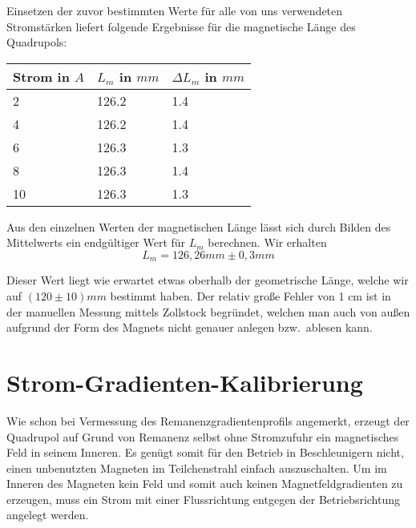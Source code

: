\documentclass[bigchapter,colorback,accentcolor=tud4b,linedtoc,11pt]{tudreport}
\begin{document}
Einsetzen der zuvor bestimmten Werte für alle von uns verwendeten Stromstärken liefert folgende Ergebnisse für die magnetische Länge des Quadrupols:
\begin{center}
  \begin{tabular}{|p{2.6cm}|p{2.6cm}|p{2.6cm}|}
    \hline
    Strom in $A$ & $L_m$ in $mm$ & $\Delta L_m$ in $mm$ \\ \hline
    2            & 126.2         & 1.4                  \\ \hline
    4            & 126.2         & 1.4                  \\ \hline
    6            & 126.3         & 1.3                  \\ \hline
    8            & 126.3         & 1.4                  \\ \hline
    10           & 126.3         & 1.3                  \\ \hline
	\end{tabular}
\end{center}

Aus den einzelnen Werten der magnetischen Länge lässt sich durch Bilden des Mittelwerts ein endgültiger Wert für $L_m$ berechnen. Wir erhalten $$L_m=126,26mm\pm0,3mm$$

Dieser Wert liegt wie erwartet etwas oberhalb der geometrische Länge, welche wir auf $(120 \pm 10)mm$ bestimmt haben. Der relativ große Fehler von 1 cm ist in der manuellen Messung mittels Zollstock begründet, welchen man auch von außen aufgrund der Form des Magnets nicht genauer anlegen bzw.\ ablesen kann.

\section{Strom-Gradienten-Kalibrierung}
Wie schon bei Vermessung des Remanenzgradientenprofils angemerkt, erzeugt der Quadrupol auf Grund von Remanenz selbst ohne Stromzufuhr ein magnetisches Feld in seinem Inneren. Es genügt somit für den Betrieb in Beschleunigern nicht, einen unbenutzten Magneten im Teilchenstrahl einfach auszuschalten. Um im Inneren des Magneten kein Feld und somit auch keinen Magnetfeldgradienten zu erzeugen, muss ein Strom mit einer Flussrichtung entgegen der Betriebsrichtung angelegt werden.
\end{document}
